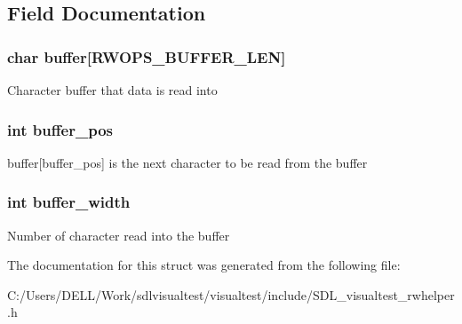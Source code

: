 \subsection{Field Documentation}
\hypertarget{struct_s_d_l_visual_test___r_w_helper_buffer_a5b528063c1aaa0e626f5d5e49de5baad}{
\subsubsection[{buffer}]{\setlength{\rightskip}{0pt plus 5cm}char buffer\mbox{[}R\-W\-O\-P\-S\-\_\-\-B\-U\-F\-F\-E\-R\-\_\-\-L\-E\-N\mbox{]}}}\label{struct_s_d_l_visual_test___r_w_helper_buffer_a5b528063c1aaa0e626f5d5e49de5baad}
Character buffer that data is read into \hypertarget{struct_s_d_l_visual_test___r_w_helper_buffer_a8a37d41b7b076eced766d7418450477d}{
\subsubsection[{buffer\-\_\-pos}]{\setlength{\rightskip}{0pt plus 5cm}int buffer\-\_\-pos}}\label{struct_s_d_l_visual_test___r_w_helper_buffer_a8a37d41b7b076eced766d7418450477d}
buffer\mbox{[}buffer\-\_\-pos\mbox{]} is the next character to be read from the buffer \hypertarget{struct_s_d_l_visual_test___r_w_helper_buffer_adb2920cd89b7b8b8b014290e82746d8c}{
\subsubsection[{buffer\-\_\-width}]{\setlength{\rightskip}{0pt plus 5cm}int buffer\-\_\-width}}\label{struct_s_d_l_visual_test___r_w_helper_buffer_adb2920cd89b7b8b8b014290e82746d8c}
Number of character read into the buffer 

The documentation for this struct was generated from the following file\-:\begin{DoxyCompactItemize}
\item 
C\-:/\-Users/\-D\-E\-L\-L/\-Work/sdlvisualtest/visualtest/include/S\-D\-L\-\_\-visualtest\-\_\-rwhelper.\-h\end{DoxyCompactItemize}
